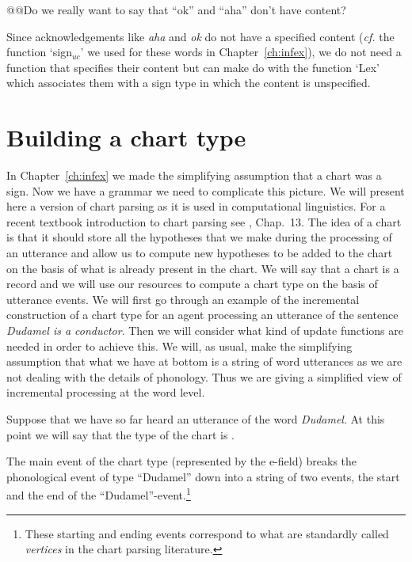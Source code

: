 @@Do we really want to say that ``ok'' and ``aha'' don't have content?

Since acknowledgements like \textit{aha} and
\textit{ok} do not have a specified content (\textit{cf.} the function
`sign$_{\mathit{uc}}$' we used for these words in
Chapter~\ref{ch:infex}), we do not need a function that specifies
their content but can make do with the function `Lex' which associates
them with a sign type in which the content is unspecified.

\section{Building a chart type}

In Chapter~\ref{ch:infex} we made the simplifying assumption that a
chart was a sign.  Now we have a grammar we need to complicate this
picture.  We will present here a version of chart parsing as it is
used in computational linguistics.  For a recent textbook introduction
to chart parsing see \cite{JurafskyMartin2009}, Chap.~13.  The idea of
a chart is that it should store all the hypotheses that we make during
the processing of an utterance and allow us to compute new hypotheses
to be added to the chart
on the basis of what is already present in the chart.  We will say
that a chart is a record and we will use our resources to compute a
chart type on the basis of utterance events.  We will first go through
an example of the incremental construction of a chart type for an
agent processing an utterance of the sentence \textit{Dudamel is a
  conductor}.  Then we will consider what kind of update functions are
needed in order to achieve this.  We will, as usual, make the
simplifying assumption that what we have at bottom is a string of word
utterances as we are not dealing with the details of phonology.  Thus
we are giving a simplified view of incremental processing at the word
level.

Suppose that we have so far heard an utterance of the word
\textit{Dudamel}.  At this point we will say that the type of the
chart is \nexteg{}.
\begin{ex} 
\label{ex:Dudamelchart}
\end{ex} 
The main event of the chart type (represented by the e-field) breaks
the phonological event of type ``Dudamel'' down into a string of two
events, the start and the end of the ``Dudamel''-event.\footnote{These
  starting and ending events correspond to what are standardly called
  \textit{vertices} in the chart parsing literature.}  


